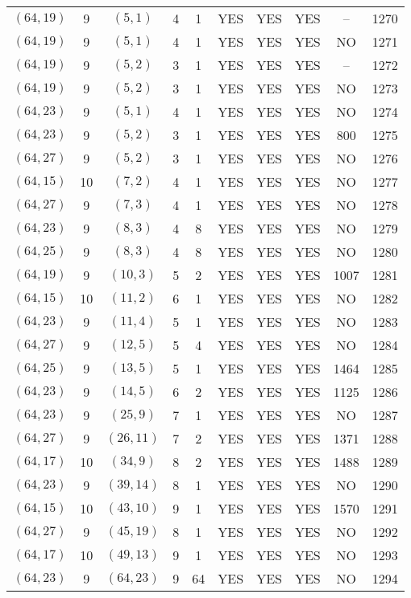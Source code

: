 \begin{longtable}{|c|c|c|c|c|c|c|c|c|c|}
$(64, 19)$ & 9 & $(5, 1)$ & 4 & 1 & YES & YES & YES & -- & 1270\\
$(64, 19)$ & 9 & $(5, 1)$ & 4 & 1 & YES & YES & YES & NO & 1271\\
$(64, 19)$ & 9 & $(5, 2)$ & 3 & 1 & YES & YES & YES & -- & 1272\\
$(64, 19)$ & 9 & $(5, 2)$ & 3 & 1 & YES & YES & YES & NO & 1273\\
$(64, 23)$ & 9 & $(5, 1)$ & 4 & 1 & YES & YES & YES & NO & 1274\\
$(64, 23)$ & 9 & $(5, 2)$ & 3 & 1 & YES & YES & YES & 800 & 1275\\
$(64, 27)$ & 9 & $(5, 2)$ & 3 & 1 & YES & YES & YES & NO & 1276\\
$(64, 15)$ & 10 & $(7, 2)$ & 4 & 1 & YES & YES & YES & NO & 1277\\
$(64, 27)$ & 9 & $(7, 3)$ & 4 & 1 & YES & YES & YES & NO & 1278\\
$(64, 23)$ & 9 & $(8, 3)$ & 4 & 8 & YES & YES & YES & NO & 1279\\
$(64, 25)$ & 9 & $(8, 3)$ & 4 & 8 & YES & YES & YES & NO & 1280\\
$(64, 19)$ & 9 & $(10, 3)$ & 5 & 2 & YES & YES & YES & 1007 & 1281\\
$(64, 15)$ & 10 & $(11, 2)$ & 6 & 1 & YES & YES & YES & NO & 1282\\
$(64, 23)$ & 9 & $(11, 4)$ & 5 & 1 & YES & YES & YES & NO & 1283\\
$(64, 27)$ & 9 & $(12, 5)$ & 5 & 4 & YES & YES & YES & NO & 1284\\
$(64, 25)$ & 9 & $(13, 5)$ & 5 & 1 & YES & YES & YES & 1464 & 1285\\
$(64, 23)$ & 9 & $(14, 5)$ & 6 & 2 & YES & YES & YES & 1125 & 1286\\
$(64, 23)$ & 9 & $(25, 9)$ & 7 & 1 & YES & YES & YES & NO & 1287\\
$(64, 27)$ & 9 & $(26, 11)$ & 7 & 2 & YES & YES & YES & 1371 & 1288\\
$(64, 17)$ & 10 & $(34, 9)$ & 8 & 2 & YES & YES & YES & 1488 & 1289\\
$(64, 23)$ & 9 & $(39, 14)$ & 8 & 1 & YES & YES & YES & NO & 1290\\
$(64, 15)$ & 10 & $(43, 10)$ & 9 & 1 & YES & YES & YES & 1570 & 1291\\
$(64, 27)$ & 9 & $(45, 19)$ & 8 & 1 & YES & YES & YES & NO & 1292\\
$(64, 17)$ & 10 & $(49, 13)$ & 9 & 1 & YES & YES & YES & NO & 1293\\
$(64, 23)$ & 9 & $(64, 23)$ & 9 & 64 & YES & YES & YES & NO & 1294\\

\end{longtable}
